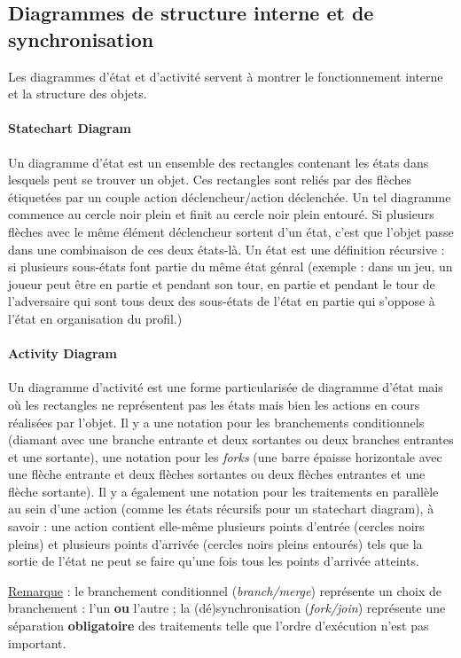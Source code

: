 \documentclass{article}
\begin{document}
	\subsection{Diagrammes de structure interne et de synchronisation}
		Les diagrammes d'état et d'activité servent à montrer le fonctionnement interne et la structure des objets.

		\paragraph{Statechart Diagram} Un diagramme d'état est un ensemble des rectangles contenant les états dans lesquels peut se trouver un objet. Ces rectangles sont reliés par des flèches
		étiquetées par un couple action déclencheur/action déclenchée. Un tel diagramme commence au cercle noir plein et finit au cercle noir plein entouré. Si plusieurs flèches avec le même élément
		déclencheur sortent d'un état, c'est que l'objet passe dans une combinaison de ces deux états-là. Un état est une définition récursive : si plusieurs sous-états font partie du même état génral
		(exemple : dans un jeu, un joueur peut être en partie et pendant son tour, en partie et pendant le tour de l'adversaire qui sont tous deux des sous-états de l'état en partie qui s'oppose à
		l'état en organisation du profil.)

		\paragraph{Activity Diagram} Un diagramme d'activité est une forme particularisée de diagramme d'état mais où les rectangles ne représentent pas les états mais bien les actions en cours
		réalisées par l'objet. Il y a une notation pour les branchements conditionnels (diamant avec une branche entrante et deux sortantes ou deux branches entrantes et une sortante), une notation
		pour les \textit{forks} (une barre épaisse horizontale avec une flèche entrante et deux flèches sortantes ou deux flèches entrantes et une flèche sortante). Il y a également une notation
		pour les traitements en parallèle au sein d'une action (comme les états récursifs pour un statechart diagram), à savoir : une action contient elle-même plusieurs points d'entrée
		(cercles noirs pleins) et plusieurs points d'arrivée (cercles noirs pleins entourés) tels que la sortie de l'état ne peut se faire qu'une fois tous les points d'arrivée atteints.

		\underline{Remarque} : le branchement conditionnel (\textit{branch/merge}) représente un choix de branchement : l'un \textbf{ou} l'autre ; la (dé)synchronisation (\textit{fork/join})
		représente une séparation \textbf{obligatoire} des traitements telle que l'ordre d'exécution n'est pas important.
\end{document}
